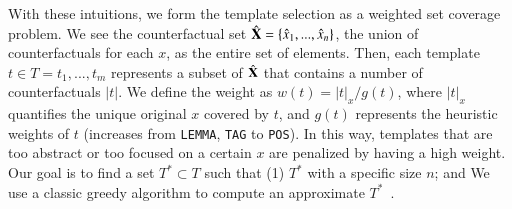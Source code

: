 
With these intuitions, we form the template selection as a weighted set coverage problem.
We see the counterfactual set $\hat{\mathbf{X}} = \{\hat{x}_1,...,\hat{x}_n\}$, the union of counterfactuals for each $x$, as the entire set of elements.
Then, each template $t \in T = {t_1,...,t_m}$ represents a subset of $\hat{\mathbf{X}}$ that contains a number of counterfactuals $|t|$.
We define the weight as $w(t) = |t|_x / g(t)$, where $|t|_x$ quantifies the unique original $x$ covered by $t$, and $g(t)$ represents the heuristic weights of $t$ (increases from \texttt{LEMMA}, \texttt{TAG} to \texttt{POS}).
In this way, templates that are too abstract or too focused on a certain $x$ are penalized by having a high weight. Our goal is to find a set $T^* \subset T$ such that (1) $T^*$ with a specific size $n$; and
We use a classic greedy algorithm to compute an approximate $T^*$~\cite{vazirani2013approximation}.
